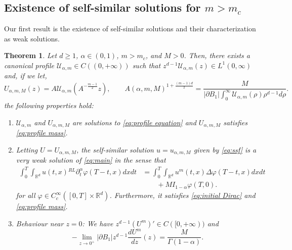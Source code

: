\documentclass[a4paper]{article}
\newtheorem{theorem}{Theorem}[section]
\theoremstyle{definition}
\newcommand{\Rd}{{\mathbb{R}^d}}
\newcommand{\dRL}{{^{RL}\partial_t^\alpha}}
\begin{document}
\subsection{Existence of self-similar solutions for $m > m_c$}
Our first result is the existence of self-similar solutions and their characterization as weak solutions.
\begin{theorem}
  \label{thm:existence}
  Let $d \ge 1$, $\alpha \in (0,1)$, $m > m_c$, and $M > 0$. Then, there exists a canonical profile $\mathcal U_{\alpha,m} \in C((0,+\infty))$ such that $z^{d-1} \mathcal U_{\alpha,m}(z) \in L^1(0,\infty)$ and, if we let,
  \begin{equation}
    \label{eq:rescaling profile to correct mass}
    U_{\alpha,m,M}(z) = A \mathcal U_{\alpha,m}(A^{-\frac{m-1}{2}} z), \qquad  A(\alpha,m,M)^{1 + \frac{(m-1)d}{2}} = \frac{M}{|\partial B_1| \int_0^\infty \mathcal U_{\alpha,m}(\rho) \rho^{d-1} d \rho}.
  \end{equation}
  the following properties hold:
  \begin{enumerate}
    \item
      $\mathcal U_{\alpha,m}$ and $U_{\alpha,m,M}$ are solutions to \eqref{eq:profile equation} and $U_{\alpha,m,M}$ satisfies \eqref{eq:profile mass}.
    \item
      Letting $U = U_{\alpha,m,M}$, the self-similar solution $u = u_{\alpha,m,M}$ given by \eqref{eq:ssf}
      is a very weak solution of \eqref{eq:main} in the sense that
      \begin{equation}
        \label{eq:very weak solution}
        \begin{aligned}
          \int_{0}^T  \int_{\Rd} u(t,x) \dRL \varphi(T-t,x)dxdt
          & = \int_0^T \int_{\Rd} u^{m}(t,x) \Delta\varphi(T-t,x)  dx dt
          \\
          & \qquad + M I_{1-\alpha}\varphi(T,0).
        \end{aligned}
      \end{equation}
      for all $\varphi \in C^\infty_c ([0,T] \times \mathbb R^d)$. Furthermore, it satisfies \eqref{eq:initial Dirac} and \eqref{eq:profile mass}.
    \item
      \label{it:slow-diffusion U near 0}
      Behaviour near $z = 0$: We have $z^{d-1}(U^m)' \in C([0,+\infty))$ and
      \begin{equation}
        \label{eq:limit of flux at z=0}
        - \lim_{z \to 0^+} |\partial B_1| z^{d-1}\frac{dU^m}{dz}(z) = \frac {M} {\Gamma(1-\alpha)}.
      \end{equation}

\end{enumerate}
\end{theorem}
\end{document}
